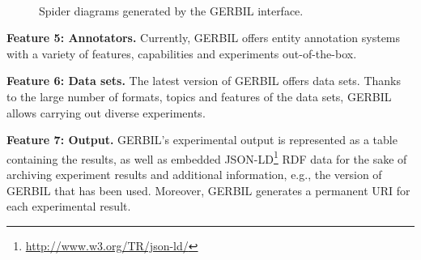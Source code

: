 \begin{figure}[htb]
\centering
{}~
\caption {Spider diagrams generated by the GERBIL interface.}
\end{figure}


\textbf{Feature 5: Annotators.}
Currently, GERBIL offers \overallGERBILannotators entity annotation systems with a variety of features, capabilities and experiments out-of-the-box. 

\textbf{Feature 6: Data sets.}
The latest version of GERBIL offers \overalldatasets data sets.
Thanks to the large number of formats, topics and features of the data sets, GERBIL allows carrying out diverse experiments.

\textbf{Feature 7: Output.}
\label{cha334:sec:output}
GERBIL's experimental output is represented as a table containing the results, as well as embedded JSON-LD\footnote{\url{http://www.w3.org/TR/json-ld/}} RDF data for the sake of archiving experiment results and additional information, e.g., the version of GERBIL that has been used.
Moreover, GERBIL generates a permanent URI for each experimental result.

